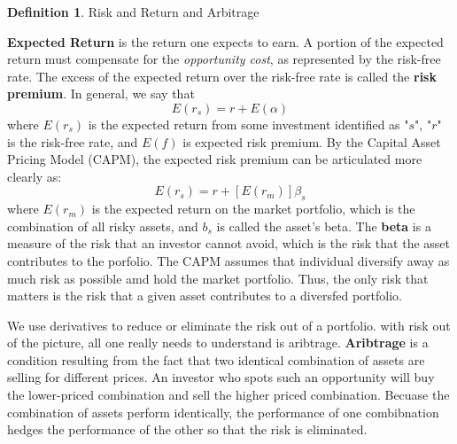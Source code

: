 \documentclass{book}
\theoremstyle{definition}
\newtheorem{definition}{Definition}[section]
\theoremstyle{remark}
\begin{document}
    \begin{definition}{Risk and Return and Arbitrage}
        
        \textbf{Expected Return} is the return one expects to earn. A portion of the expected return must compensate for the \textit{opportunity cost}, as represented by the risk-free rate. The excess of the expected return over the risk-free rate is called the \textbf{risk premium}. In general, we say that 
            \begin{equation}
                E(r_s)= r + E(\alpha)
            \end{equation}
        where $E(r_s)$ is the expected return from some investment identified as "$s$", "$r$" is the risk-free rate, and $E(f)$ is expected risk premium. By the Capital Asset Pricing Model (CAPM), the expected risk premium can be articulated more clearly as: 
            \begin{equation}
                E(r_s) = r + [E(r_m)]\beta_s
            \end{equation}
        where $E(r_m)$ is the expected return on the market portfolio, which is the combination of all risky assets, and $b_s$ is called the asset's beta. The \textbf{beta} is a measure of the risk that an investor cannot avoid, which is the risk that the asset contributes to the porfolio. The CAPM assumes that individual diversify away as much risk as possible amd hold the market portfolio. Thus, the only risk that matters is the risk that a given asset contributes to a diversfed portfolio.
        
        We use derivatives to reduce or eliminate the risk out of a portfolio. with risk out of the picture, all one really needs to understand is aribtrage. \textbf{Aribtrage} is a condition resulting from the fact that two identical combination of assets are selling for different prices. An investor who spots such an opportunity will buy the lower-priced combination and sell the higher priced combination. Becuase the combination of assets perform identically, the performance of one combibnation hedges the performance of the other so that the risk is eliminated. 
    \end{definition}
\end{document}
